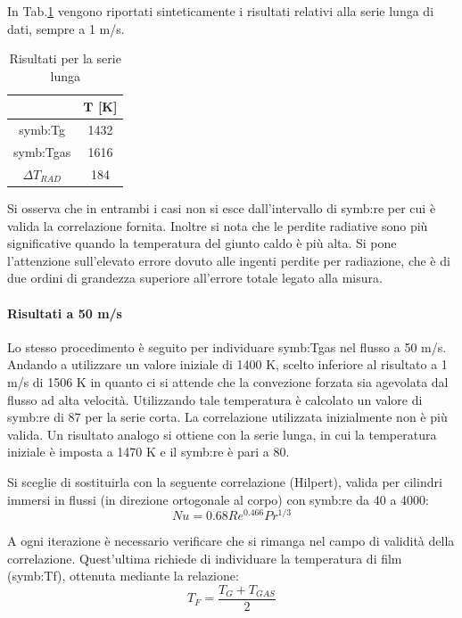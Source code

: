 In Tab.\ref{tab:risultatilong1} vengono riportati sinteticamente i risultati relativi alla serie lunga di dati, sempre a 1 m/s.

\begin{table}[H]
	\centering
	\begin{tabular}{c|c}
		\toprule
		\toprule
		         & $\bm{T}$ [K]\\
		\midrule
		\midrule
		\gls{symb:Tg} & 1432 \\
		\midrule
		\gls{symb:Tgas} & 1616 \\
		\midrule
		$\Delta T_{\textit{RAD}}$ & 184 \\
		\bottomrule
		\bottomrule	
	\end{tabular}
\caption{Risultati per la serie lunga}
\label{tab:risultatilong1}
\end{table}

Si osserva che in entrambi i casi non si esce dall'intervallo di \gls{symb:re} per cui è valida la correlazione fornita. Inoltre si nota che le perdite radiative sono più significative quando la temperatura del giunto caldo è più alta. Si pone l'attenzione sull'elevato errore dovuto alle ingenti perdite per radiazione, che è di due ordini di grandezza superiore all'errore totale legato alla misura. 

\paragraph{Risultati a 50 m/s}
Lo stesso procedimento è seguito per individuare \gls{symb:Tgas} nel flusso a 50 m/s. Andando a utilizzare un valore iniziale di 1400 K, scelto inferiore al risultato a 1 m/s di 1506 K in quanto ci si attende che la convezione forzata sia agevolata dal flusso ad alta velocità. Utilizzando tale temperatura è calcolato un valore di \gls{symb:re} di 87 per la serie corta. La correlazione utilizzata inizialmente non è più valida. Un risultato analogo si ottiene con la serie lunga, in cui la temperatura iniziale è imposta a 1470 K e il \gls{symb:re} è pari a 80.

Si sceglie di sostituirla con la seguente correlazione (Hilpert), valida per cilindri immersi in flussi (in direzione ortogonale al corpo) con \gls{symb:re} da 40 a 4000:
\begin{equation}
	Nu = 0.68 Re^{0.466}Pr^{1/3}
\end{equation}



A ogni iterazione è necessario verificare che si rimanga nel campo di validità della correlazione. Quest'ultima richiede di individuare la temperatura di film (\gls{symb:Tf}), ottenuta mediante la relazione: 
\begin{equation}
	T_F=\frac{T_G+T_{\textit{GAS}}}{2}
\end{equation}

